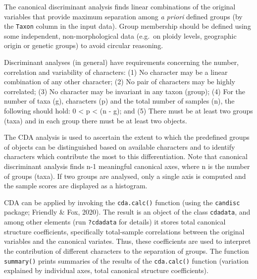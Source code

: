 \documentclass[
]{article}
\begin{document}
The canonical discriminant analysis finds linear combinations of the
original variables that provide maximum separation among \emph{a priori}
defined groups (by the \texttt{Taxon} column in the input data). Group
membership should be defined using some independent, non-morphological
data (e.g.~on ploidy levels, geographic origin or genetic groups) to
avoid circular reasoning.

Discriminant analyses (in general) have requirements concerning the
number, correlation and variability of characters: (1) No character may
be a linear combination of any other character; (2) No pair of
characters may be highly correlated; (3) No character may be invariant
in any taxon (group); (4) For the number of taxa (g), characters (p) and
the total number of samples (n), the following should hold: 0
\textless{} p \textless{} (n - g); and (5) There must be at least two
groups (taxa) and in each group there must be at least two objects.

The CDA analysis is used to ascertain the extent to which the predefined
groups of objects can be distinguished based on available characters and
to identify characters which contribute the most to this
differentiation. Note that canonical discriminant analysis finds n-1
meaningful canonical axes, where n is the number of groups (taxa). If
two groups are analysed, only a single axis is computed and the sample
scores are displayed as a histogram.

CDA can be applied by invoking the \texttt{cda.calc()} function (using
the \texttt{candisc} package; Friendly \& Fox, 2020). The result is an
object of the class \texttt{cdadata}, and among other elements (run
\texttt{?cdadata} for details) it stores total canonical structure
coefficients, specifically total-sample correlations between the
original variables and the canonical variates. Thus, these coefficients
are used to interpret the contribution of different characters to the
separation of groups. The function \texttt{summary()} prints summaries
of the results of the \texttt{cda.calc()} function (variation explained
by individual axes, total canonical structure coefficients).
\end{document}
